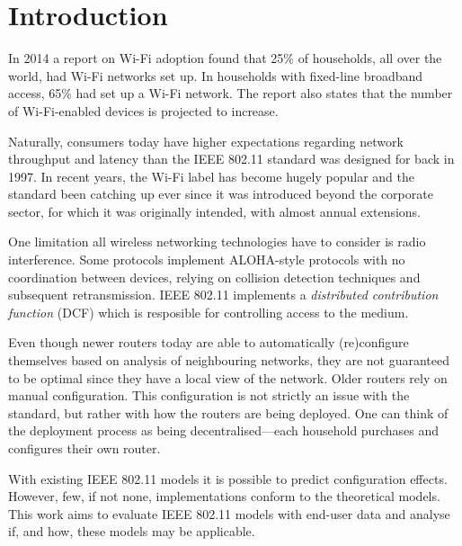 \chapter{Introduction}

In 2014 a report on Wi-Fi adoption found that 25\% of households, all over the
world, had Wi-Fi networks set up. In households with fixed-line broadband
access, 65\% had set up a Wi-Fi network\cite{smith}. The report also states that
the number of Wi-Fi-enabled devices is projected to increase.

Naturally, consumers today have higher expectations regarding network throughput
and latency than the IEEE 802.11 standard was designed for back in 1997. In
recent years, the Wi-Fi label has become hugely popular and the standard been
catching up ever since it was introduced beyond the corporate sector, for which
it was originally intended, with almost annual extensions.

One limitation all wireless networking technologies have to consider is radio
interference. Some protocols implement ALOHA-style protocols with no
coordination between devices, relying on collision detection techniques and
subsequent retransmission. IEEE 802.11 implements a \emph{distributed
contribution function} (DCF) which is resposible for controlling access to the
medium.

Even though newer routers today are able to automatically (re)configure
themselves based on analysis of neighbouring networks, they are not guaranteed
to be optimal since they have a local view of the network. Older routers rely on
manual configuration. This configuration is not strictly an issue with the
standard, but rather with how the routers are being deployed. One can think of
the deployment process as being decentralised—each household purchases and
configures their own router.

With existing IEEE 802.11 models it is possible to predict configuration
effects. However, few, if not none, implementations conform to the theoretical
models. This work aims to evaluate IEEE 802.11 models with end-user data and
analyse if, and how, these models may be applicable.





